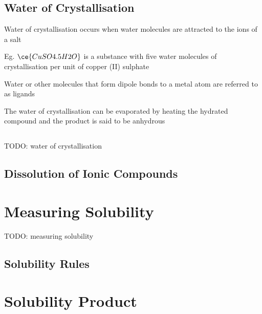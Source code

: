 	\subsection{Water of Crystallisation}
		Water of crystallisation occurs when water molecules are attracted to the ions of a salt

		Eg. $\ce{CuSO4 . 5H2O}$ is a substance with five water molecules of crystallisation per unit of copper (II) sulphate

		Water or other molecules that form dipole bonds to a metal atom are referred to as ligands

		The water of crystallisation can be evaporated by heating the hydrated compound and the product is said to be anhydrous
	\subsection{} TODO: water of crystallisation

	\subsection{Dissolution of Ionic Compounds}

\section{Measuring Solubility} \label{20/11/2024} TODO: measuring solubility
	\subsection{Solubility Rules}

\section{Solubility Product}